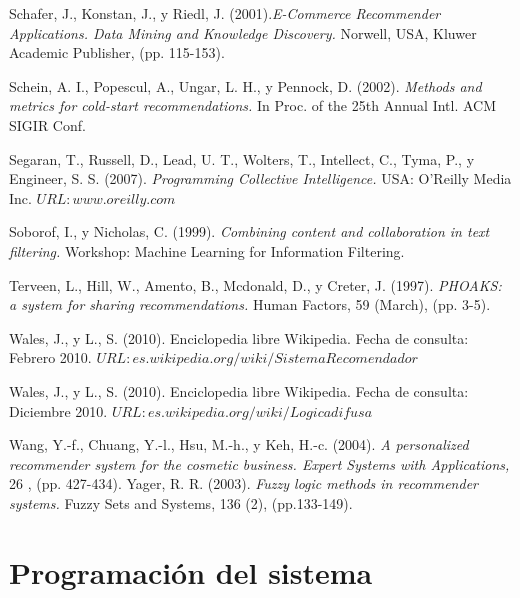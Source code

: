 \documentclass[12pt,letterpaper,oneside] {memoir}
\begin{document}
\begin{thebibliography}{99}
 Schafer, J., Konstan, J., y Riedl, J. (2001).\textit{E-Commerce Recommender Applications. Data Mining and Knowledge Discovery.}  Norwell, USA, Kluwer Academic Publisher, (pp. 115-153).

 Schein, A. I., Popescul, A., Ungar, L. H., y Pennock, D. (2002). \textit{ Methods and metrics for cold-start recommendations.} In Proc. of the 25th Annual Intl. ACM SIGIR Conf.

 Segaran, T., Russell, D., Lead, U. T., Wolters, T., Intellect, C., Tyma, P., y Engineer, S. S. (2007). \textit{Programming Collective Intelligence.} USA: O'Reilly Media Inc. 
$URL: www.oreilly.com$

 Soborof, I., y Nicholas, C. (1999). \textit{ Combining content and collaboration in text filtering.} Workshop: Machine Learning for Information Filtering.

 Terveen, L., Hill, W., Amento, B., Mcdonald, D., y Creter, J. (1997). \textit{PHOAKS: a system for sharing recommendations.} Human Factors, 59 (March), (pp. 3-5).

 Wales, J., y L., S. (2010). Enciclopedia libre Wikipedia. Fecha de consulta: Febrero 2010. $URL: es.wikipedia.org/wiki/SistemaRecomendador$

  Wales, J., y L., S. (2010). Enciclopedia libre Wikipedia. Fecha de consulta: Diciembre 2010. $URL: es.wikipedia.org/wiki/Logicadifusa$

 Wang, Y.-f., Chuang, Y.-l., Hsu, M.-h., y Keh, H.-c. (2004). \textit{A personalized recommender system for the cosmetic business. Expert Systems with Applications,}  26 , (pp. 427-434).
 Yager, R. R. (2003). \textit{Fuzzy logic methods in recommender systems.} Fuzzy Sets and Systems, 136 (2), (pp.133-149).
\end{thebibliography}

\appendix

\chapter{Programación del sistema}
\end{document}

